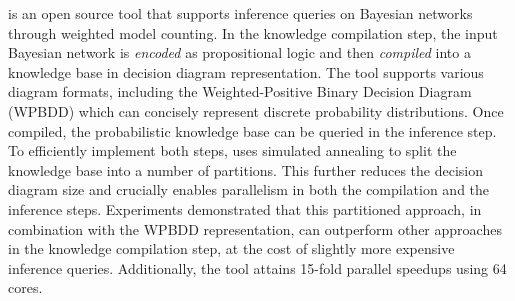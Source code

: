 
\toolname is an open source tool that supports inference queries on Bayesian networks through weighted model counting.
In the knowledge compilation step, the input Bayesian network is \emph{encoded} as propositional logic and then \emph{compiled} into a knowledge base in decision diagram representation. The tool supports various diagram formats, including the Weighted-Positive Binary Decision Diagram (WPBDD) which can concisely represent discrete probability distributions.
Once compiled, the probabilistic knowledge base can be queried in the inference step.
To efficiently implement both steps, \toolname uses simulated annealing to split the knowledge base into a number of partitions. This further reduces the decision diagram size and crucially enables parallelism in both the compilation and the inference steps.
Experiments demonstrated that this partitioned approach, in combination with the WPBDD representation, can outperform other approaches in the knowledge compilation step, at the cost of slightly more expensive inference queries.
Additionally, the tool attains 15-fold parallel speedups using 64 cores.

